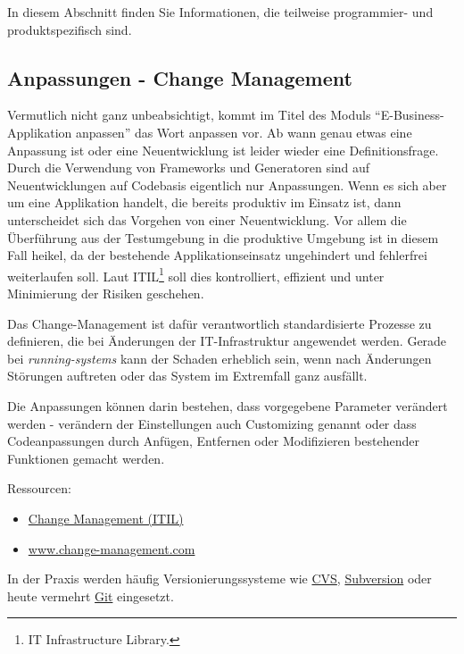 In diesem Abschnitt finden Sie Informationen, die teilweise programmier- und produktspezifisch sind.

\subsection{Anpassungen - Change Management}
\label{subsub:change-management}


Vermutlich nicht ganz unbeabsichtigt, kommt im Titel des Moduls ``E-Business-Applikation anpassen''
das Wort anpassen vor. Ab wann genau etwas eine Anpassung ist oder eine Neuentwicklung ist leider
wieder eine Definitionsfrage. Durch die Verwendung von Frameworks und Generatoren sind auf
Neuentwicklungen auf Codebasis eigentlich nur Anpassungen. Wenn es sich aber um eine Applikation
handelt, die bereits produktiv im Einsatz ist, dann unterscheidet sich das Vorgehen von einer
Neuentwicklung. Vor allem die Überführung aus der Testumgebung in die produktive Umgebung
ist in diesem Fall heikel, da der bestehende Applikationseinsatz ungehindert und fehlerfrei
weiterlaufen soll. Laut ITIL\footnote{IT Infrastructure Library.}
soll dies kontrolliert, effizient und unter Minimierung der Risiken geschehen.

Das Change-Management ist dafür verantwortlich standardisierte Prozesse zu definieren,
die bei Änderungen der IT-Infrastruktur angewendet werden. Gerade bei \emph{running-systems}
kann der Schaden erheblich sein, wenn nach Änderungen Störungen auftreten oder das System
im Extremfall ganz ausfällt.

Die Anpassungen können darin bestehen, dass vorgegebene Parameter verändert werden - verändern
der Einstellungen auch Customizing genannt oder dass Codeanpassungen durch Anfügen,
Entfernen oder Modifizieren bestehender Funktionen gemacht werden.

Ressourcen:
\begin{itemize}
    \item \href{https://de.wikipedia.org/wiki/Change_Management_(ITIL)}{Change Management (ITIL)}
    \item \href{http://www.change-management.com}{www.change-management.com}
\end{itemize}

In der Praxis werden häufig Versionierungssysteme wie \href{https://de.wikipedia.org/wiki/Concurrent_Versions_System}{CVS},
\href{https://de.wikipedia.org/wiki/Apache_Subversion}{Subversion} oder heute
vermehrt \href{https://de.wikipedia.org/wiki/Git}{Git} eingesetzt.

